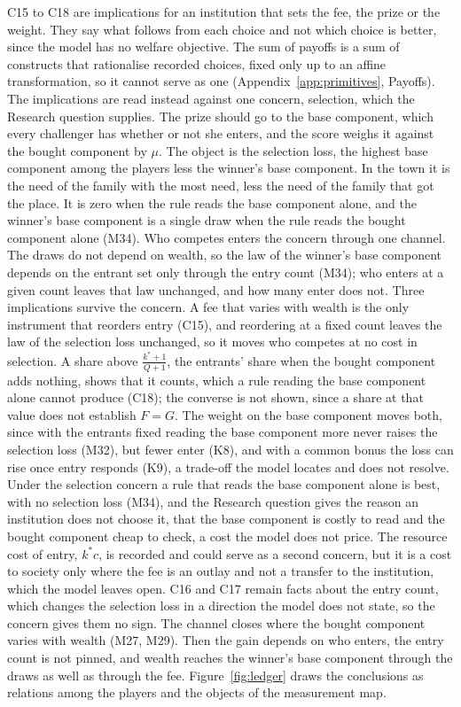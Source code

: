 C15 to C18 are implications for an institution that sets the fee, the
prize or the weight. They say what follows from each choice and not which
choice is better, since the model has no welfare objective. The sum of payoffs
is a sum of constructs that rationalise recorded choices, fixed only up to an
affine transformation, so it cannot serve as one (Appendix~\ref{app:primitives},
Payoffs). The implications are read instead against one concern, selection,
which the Research question supplies. The prize should go to the base
component, which every challenger has whether or not she enters, and the score
weighs it against the bought component by $\mu$. The object is the selection
loss, the highest base component among the players less the winner's base
component. In the town it is the need of the family with the most need, less
the need of the family that got the place. It is zero when the rule reads the base component alone, and the
winner's base component is a single draw when the rule reads the bought
component alone (M34). Who competes enters the concern through one channel.
The draws do not depend on wealth, so the law of the winner's base component
depends on the entrant set only through the entry count (M34); who enters at a
given count leaves that law unchanged, and how many enter does not. Three
implications survive the concern. A fee that varies with wealth is the only
instrument that reorders entry (C15), and reordering at a fixed count leaves
the law of the selection loss unchanged, so it moves who competes at no cost
in selection. A share above $\frac{k^*+1}{Q+1}$, the entrants' share when the
bought component adds nothing, shows that it counts, which a rule reading the
base component alone cannot produce (C18); the converse is not shown, since a
share at that value does not establish $F=G$. The weight on the base component
moves both, since with the entrants fixed reading the base component more
never raises the selection loss (M32), but fewer enter (K8), and with a common
bonus the loss can rise once entry responds (K9), a trade-off the model locates and does not resolve. Under the selection
concern a rule that reads the base component alone is best, with no selection
loss (M34), and the Research question gives the reason an institution does not
choose it, that the base component is costly to read and the bought component
cheap to check, a cost the model does not price. The resource cost of entry,
$k^*c$, is recorded and could serve as a second concern, but it is a cost to
society only where the fee is an outlay and not a transfer to the institution,
which the model leaves open. C16 and C17 remain facts about the entry count,
which changes the selection loss in a direction the model does not state, so
the concern gives them no sign. The channel closes where the bought component
varies with wealth (M27, M29). Then the gain depends on who enters, the entry
count is not pinned, and wealth reaches the winner's base component through
the draws as well as through the fee. Figure~\ref{fig:ledger}
draws the conclusions as relations among the players and the objects of the
measurement map.

